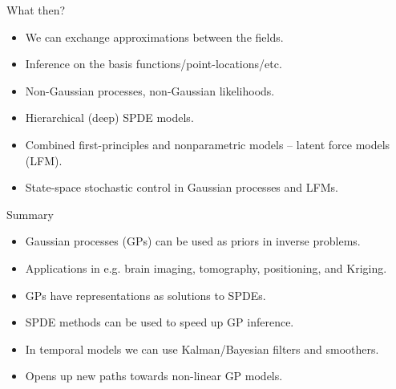 \documentclass[first=dgreen,second=purple,presentation]{elecslides}
\begin{document}
\begin{frame}{What then?}

\begin{itemize}[<+->]
\item We can \alert{exchange approximations} between the fields.
\item \alert{Inference} on the basis functions/point-locations/etc.
\item \alert{Non-Gaussian} processes, non-Gaussian likelihoods.
\item \alert{Hierarchical} (deep) \alert{SPDE models}.
\item \alert{Combined first-principles} and nonparametric models -- latent force models (LFM).
\item \alert{State-space stochastic control} in Gaussian processes and LFMs.
\end{itemize}

\end{frame}

\begin{frame}{Summary}
\begin{itemize}[<+->]
\item Gaussian processes (GPs) can be used as \alert{priors in inverse problems}.
\item Applications in e.g. \alert{brain imaging, tomography, positioning, and Kriging}.
\item GPs have representations as \alert{solutions to SPDEs}.
\item SPDE methods can be used to \alert{speed up GP inference}.
\item In temporal models we can use \alert{Kalman/Bayesian filters and smoothers}.
\item Opens up new paths towards \alert{non-linear GP models}.
\end{itemize}
\end{frame}


\end{document}
